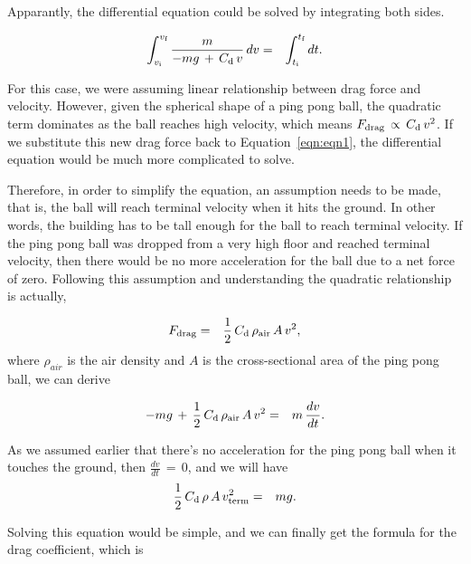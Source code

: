 \documentclass{article}
\begin{document}
\noindent Apparantly, the differential equation could be solved by integrating both sides. 

\begin{eqnarray}
\int_{v_{\textnormal{i}}}^{v_{\textnormal{f}}} \frac{m}{-mg\,+\,C_{\textnormal{d}}\,v}\,dv&=&\int_{t_{\textnormal{i}}}^{t_{\textnormal{f}}}dt.
\end{eqnarray}

\noindent For this case, we were assuming linear relationship between drag force and velocity. However, given the spherical shape of a ping pong ball, the quadratic term dominates as the ball reaches high velocity, which means $F_{\textnormal{drag}}\,\propto\,C_{\textnormal{d}}\,v^{2}$. If we substitute this new drag force back to Equation~\ref{eqn:eqn1}, the differential equation would be much more complicated to solve. 

\noindent Therefore, in order to simplify the equation, an assumption needs to be made, that is, the ball will reach terminal velocity when it hits the ground. In other words, the building has to be tall enough for the ball to reach terminal velocity. If the ping pong ball was dropped from a very high floor and reached terminal velocity, then there would be no more acceleration for the ball due to a net force of zero. Following this assumption and understanding the quadratic relationship is actually, 


\begin{eqnarray}
F_{\textnormal{drag}}&=&\frac{1}{2}\,C_{\textnormal{d}}\,\rho_{\textnormal{air}}\,A\,v^{2},
\end{eqnarray}
\noindent where $\rho_{air}$ is the air density and $A$ is the cross-sectional area of the ping pong ball, we can derive 

\begin{eqnarray}
-mg\,+\,\frac{1}{2}\,C_{\textnormal{d}}\,\rho_{\textnormal{air}}\,A\,v^{2}&=&m\,\frac{dv}{dt}.
\end{eqnarray}

\noindent As we assumed earlier that there's no acceleration for the ping pong ball when it touches the ground, then $\frac{dv}{dt}\,=\,0$, and we will have 
\begin{eqnarray}
\frac{1}{2}\,C_{\textnormal{d}}\,\rho\,A\,v_{\textnormal{term}}^{2}&=&mg. 
\end{eqnarray}

\noindent Solving this equation would be simple, and we can finally get the formula for the drag coefficient, which is 
\end{document}
